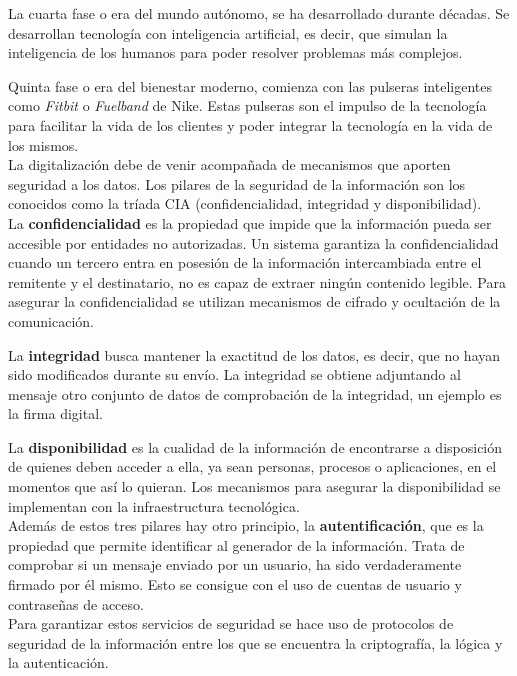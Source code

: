 La cuarta fase o era del mundo autónomo, se ha desarrollado durante décadas. Se desarrollan tecnología con inteligencia artificial, es decir, que simulan la inteligencia de los humanos para poder resolver problemas más complejos.

Quinta fase o era del bienestar moderno, comienza con las pulseras inteligentes como \textit{Fitbit} o \textit{Fuelband} de Nike. Estas pulseras son el impulso de la tecnología para facilitar la vida de los clientes y poder integrar la tecnología en la vida de los mismos.\\

La digitalización debe de venir acompañada de mecanismos que aporten seguridad a los datos. Los pilares de la seguridad de la información son los conocidos como la tríada CIA (confidencialidad, integridad y  disponibilidad)\cite{servicios-seguridad}.\\

La \textbf{confidencialidad} es la propiedad que impide que la información pueda ser accesible por entidades no autorizadas. Un sistema garantiza la confidencialidad cuando un tercero entra en posesión de la información intercambiada entre el remitente y el destinatario, no es capaz de extraer ningún contenido legible. Para asegurar la confidencialidad se utilizan mecanismos de cifrado y ocultación de la comunicación.

La \textbf{integridad} busca mantener la exactitud de los datos, es decir, que no hayan sido modificados durante su envío. La integridad se obtiene adjuntando al mensaje otro conjunto de datos de comprobación de la integridad, un ejemplo es la firma digital.

La \textbf{disponibilidad} es la cualidad de la información de encontrarse a disposición de quienes deben acceder a ella, ya sean personas, procesos o aplicaciones, en el momentos que así lo quieran. Los mecanismos para asegurar la disponibilidad se implementan con la infraestructura tecnológica.\\

Además de estos tres pilares hay otro principio, la \textbf{autentificación}, que es la propiedad que permite identificar al generador de la información. Trata de comprobar si un mensaje enviado por un usuario, ha sido verdaderamente firmado por él mismo. Esto se consigue con el uso de cuentas de usuario y contraseñas de acceso.\\

Para garantizar estos servicios de seguridad se hace uso de protocolos de seguridad de la información entre los que se encuentra la criptografía, la lógica y la autenticación.\\

